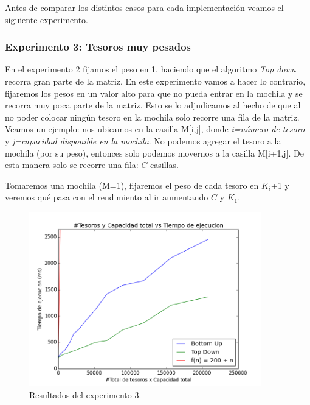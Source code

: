 \par Antes de comparar los distintos casos para cada implementación veamos el siguiente experimento.

\subsubsection{Experimento 3: Tesoros muy pesados}

\par En el experimento 2 fijamos el peso en 1, haciendo que el algoritmo \textit{Top down} recorra gran parte de la matriz. En este experimento vamos a hacer lo contrario, fijaremos los pesos en un valor alto para que no pueda entrar en la mochila y se recorra muy poca parte de la matriz. Esto se lo adjudicamos al hecho de que al no poder colocar ningún tesoro en la mochila solo recorre una fila de la matriz. Veamos un ejemplo: nos ubicamos en la casilla M[i,j], donde \textit{i=número de tesoro} y \textit{j=capacidad disponible en la mochila}. No podemos agregar el tesoro a la mochila (por su peso), entonces solo podemos movernos a la casilla M[i+1,j]. De esta manera solo se recorre una fila: $C$ casillas.

\par Tomaremos una mochila (M=1), fijaremos el peso de cada tesoro en $K_i$+1 y veremos qué pasa con el rendimiento al ir aumentando $C$ y $K_1$.

\begin{figure}[H]
	\centering
	\includegraphics[width=0.9\textwidth]{Problema3/img/exp3_tiempos_mejor.png}
	\caption{Resultados del experimento 3.}
	\label{fig: exp3_tiempos_mejor}
\end{figure}


